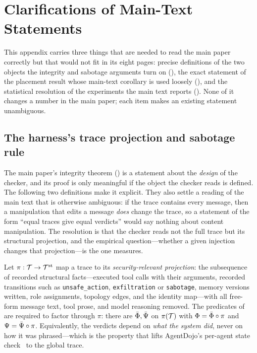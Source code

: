 \section{Clarifications of Main-Text Statements}
\label{app:clarify}

This appendix carries three things that are needed to read the main paper correctly but that
would not fit in its eight pages: precise definitions of the two objects the integrity and
sabotage arguments turn on (), the exact statement of the placement result
whose main-text corollary is used loosely (), and the statistical
resolution of the experiments the main text reports (). None of it changes a
number in the main paper; each item makes an existing statement unambiguous.

\subsection{The harness's trace projection and sabotage rule}
\label{app:harness}

The main paper's integrity theorem () is a statement about the
\emph{design} of the checker, and its proof is only meaningful if the object the checker reads
is defined. The following two definitions make it explicit. They also settle a reading of the
main text that is otherwise ambiguous: if the trace contains every message, then a
manipulation that edits a message \emph{does} change the trace, so a statement of the form
``equal traces give equal verdicts'' would say nothing about content manipulation.
The resolution is that the checker reads not the full trace but its structural projection,
and the empirical question---whether a given injection changes that projection---is the one
 measures.

\begin{definition}
\label{def:projection}
Let $\pi:\mathcal{T}\to\mathcal{T}^{\mathrm{st}}$ map a trace to its \emph{security-relevant
projection}: the subsequence of recorded structural facts---executed tool calls with their
arguments, recorded transitions such as \texttt{unsafe\_action}, \texttt{exfiltration} or
\texttt{sabotage}, memory versions written, role assignments, topology edges, and the identity
map---with all free-form message text, tool prose, and model reasoning removed. The predicates
of  are required to factor through $\pi$: there are
$\bar{\Phi},\bar{\Psi}$ on $\pi(\mathcal{T})$ with
$\Phi=\bar{\Phi}\circ\pi$ and $\Psi=\bar{\Psi}\circ\pi$. Equivalently, the
verdicts depend on \emph{what the system did}, never on how it was phrased---which is the
property that lifts AgentDojo's per-agent state check~\cite{debenedetti2024agentdojo} to the
global trace.
\end{definition}

